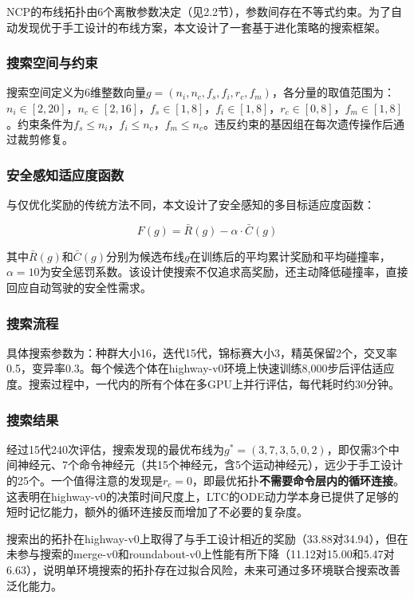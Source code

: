 \xiaosi

NCP的布线拓扑由6个离散参数决定（见2.2节），参数间存在不等式约束。为了自动发现优于手工设计的布线方案，本文设计了一套基于进化策略的搜索框架。

\subsubsection{搜索空间与约束}

搜索空间定义为6维整数向量$g = (n_i, n_c, f_s, f_i, r_c, f_m)$，各分量的取值范围为：$n_i \in [2,20]$，$n_c \in [2,16]$，$f_s \in [1,8]$，$f_i \in [1,8]$，$r_c \in [0,8]$，$f_m \in [1,8]$。约束条件为$f_s \leq n_i$，$f_i \leq n_c$，$f_m \leq n_c$。违反约束的基因组在每次遗传操作后通过裁剪修复。

\subsubsection{安全感知适应度函数}

与仅优化奖励的传统方法不同，本文设计了安全感知的多目标适应度函数：

\begin{equation}
    F(g) = \bar{R}(g) - \alpha \cdot \bar{C}(g)
    \label{eq:fitness}
\end{equation}

其中$\bar{R}(g)$和$\bar{C}(g)$分别为候选布线$g$在训练后的平均累计奖励和平均碰撞率，$\alpha = 10$为安全惩罚系数。该设计使搜索不仅追求高奖励，还主动降低碰撞率，直接回应自动驾驶的安全性需求。

\subsubsection{搜索流程}

具体搜索参数为：种群大小16，迭代15代，锦标赛大小3，精英保留2个，交叉率0.5，变异率0.3。每个候选个体在highway-v0环境上快速训练8,000步后评估适应度。搜索过程中，一代内的所有个体在多GPU上并行评估，每代耗时约30分钟。

\subsubsection{搜索结果}

经过15代240次评估，搜索发现的最优布线为$g^* = (3, 7, 3, 5, 0, 2)$，即仅需3个中间神经元、7个命令神经元（共15个神经元，含5个运动神经元），远少于手工设计的25个。一个值得注意的发现是$r_c = 0$，即最优拓扑\textbf{不需要命令层内的循环连接}。这表明在highway-v0的决策时间尺度上，LTC的ODE动力学本身已提供了足够的短时记忆能力，额外的循环连接反而增加了不必要的复杂度。

搜索出的拓扑在highway-v0上取得了与手工设计相近的奖励（33.88对34.94），但在未参与搜索的merge-v0和roundabout-v0上性能有所下降（11.12对15.00和5.47对6.63），说明单环境搜索的拓扑存在过拟合风险，未来可通过多环境联合搜索改善泛化能力。
